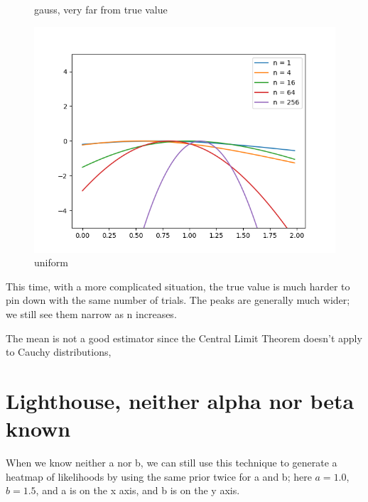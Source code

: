\documentclass[english]{scrartcl}
\begin{document}
\begin{figure}[H]
	\caption{gauss, very far from true value} 
	\endminipage \hfill
	\includegraphics[width=\linewidth]{lighthouse/1d/h=0.4/unif}
	\caption{uniform} 
	\endminipage \hfill
\end{figure}

\par This time, with a more complicated situation, the true value is much harder to pin down with the same number of trials. The peaks are generally much wider; we still see them narrow as n increases.

\par The mean is not a good estimator since the Central Limit Theorem doesn't apply to Cauchy distributions, 

\newpage
\section{Lighthouse, neither alpha nor beta known}
\par When we know neither a nor b, we can still use this technique to generate a heatmap of likelihoods by using the same prior twice for a and b; here $a=1.0$, $b=1.5$, and a is on the x axis, and b is on the y axis.
\end{document}
